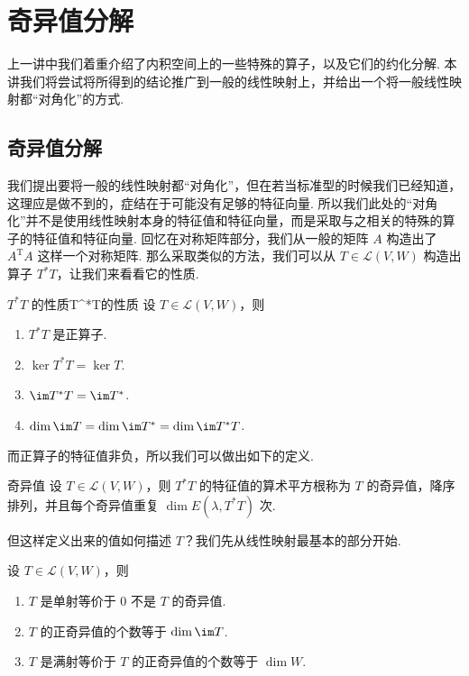 \chapter{奇异值分解}

上一讲中我们着重介绍了内积空间上的一些特殊的算子，以及它们的约化分解. 本讲我们将尝试将所得到的结论推广到一般的线性映射上，并给出一个将一般线性映射都“对角化”的方式.

\section{奇异值分解}

我们提出要将一般的线性映射都“对角化”，但在若当标准型的时候我们已经知道，这理应是做不到的，症结在于可能没有足够的特征向量. 所以我们此处的“对角化”并不是使用线性映射本身的特征值和特征向量，而是采取与之相关的特殊的算子的特征值和特征向量. 回忆在对称矩阵部分，我们从一般的矩阵 $ A $ 构造出了 $ A^{\mathrm{T}}A $ 这样一个对称矩阵. 那么采取类似的方法，我们可以从 $ T \in \mathcal{L}(V, W) $ 构造出算子 $ T^*T $，让我们来看看它的性质.

\begin{theorem}{$ T^*T $ 的性质}{T^*T的性质}
    设 $ T \in \mathcal{L}(V, W) $，则
    \begin{enumerate}
        \item $ T^*T $ 是正算子.

        \item $ \ker T^*T = \ker T $.

        \item $ \im T^*T = \im T^* $.

        \item $ \dim \im T = \dim \im T^* = \dim \im T^*T $.
    \end{enumerate}
\end{theorem}

而正算子的特征值非负，所以我们可以做出如下的定义.

\begin{definition}{奇异值}{} 
    设 $ T \in \mathcal{L}(V, W) $，则 $ T^*T $ 的特征值的算术平方根称为 $ T $ 的奇异值，降序排列，并且每个奇异值重复 $ \dim E(\lambda, T^*T) $ 次.
\end{definition}

但这样定义出来的值如何描述 $ T $？我们先从线性映射最基本的部分开始.

\begin{theorem}{}{}
    设 $ T \in \mathcal{L}(V, W) $，则
    \begin{enumerate}
        \item $ T $ 是单射等价于 $ 0 $ 不是 $ T $ 的奇异值.

        \item $ T $ 的正奇异值的个数等于 $ \dim \im T $.

        \item $ T $ 是满射等价于 $ T $ 的正奇异值的个数等于 $ \dim W $.
    \end{enumerate}
\end{theorem}

